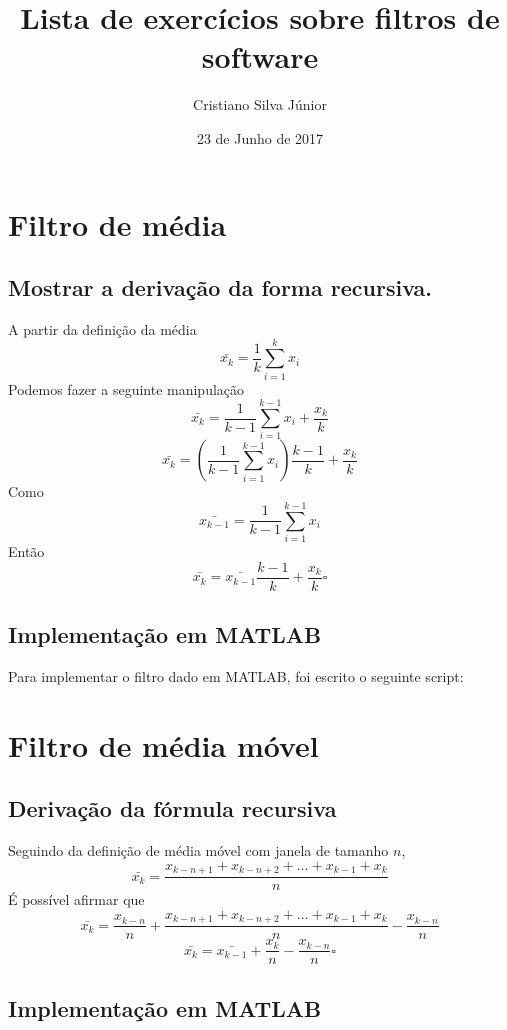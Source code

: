 \documentclass[12pt, a4paper, twoside]{article}
\begin{document}
\title{Lista de exercícios sobre filtros de software}
\author{Cristiano Silva Júnior}
\date{23 de Junho de 2017}
\maketitle

\section{Filtro de média}

\subsection{Mostrar a derivação da forma recursiva.}

A partir da definição da média
$$\bar{x_k}=\frac{1}{k}\sum^{k}_{i=1}{x_i}$$
Podemos fazer a seguinte manipulação
$$\bar{x_k}=\frac{1}{k-1}\sum^{k-1}_{i=1}{x_i}+\frac{x_k}{k}$$
$$\bar{x_k}=(\frac{1}{k-1}\sum^{k-1}_{i=1}{x_i})\frac{k-1}{k}+\frac{x_k}{k}$$
Como
$$\bar{x_{k-1}}=\frac{1}{k-1}\sum^{k-1}_{i=1}{x_i}$$
Então
$$\bar{x_k}=\bar{x_{k-1}}\frac{k-1}{k}+\frac{x_k}{k}\square$$

\subsection{Implementação em MATLAB}

Para implementar o filtro dado em MATLAB, foi escrito o seguinte script:


\section{Filtro de média móvel}

\subsection{Derivação da fórmula recursiva}

Seguindo da definição de média móvel com janela de tamanho $n$,
$$\bar{x_k}=\frac{x_{k-n+1}+x_{k-n+2}+\ldots+x_{k-1}+x_{k}}{n}$$
É possível afirmar que
$$\bar{x_k}=\frac{x_{k-n}}{n} + \frac{x_{k-n+1}+x_{k-n+2}+\ldots+x_{k-1}+x_{k}}{n} -\frac{x_{k-n}}{n}$$
$$\bar{x_k}=\bar{x_{k-1}} + \frac{x_k}{n} - \frac{x_{k-n}}{n}\square$$


\subsection{Implementação em MATLAB}
\end{document}

